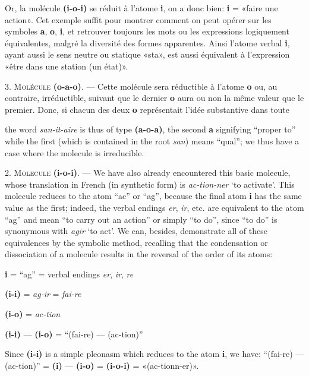 \begin{sloppypar}
{{     Or, la molécule \textbf{(i-o-i)} se réduit à l’atome \textbf{i},
     on a donc bien: \textbf{i} = «faire une action». Cet exemple
     suffit pour montrer comment on peut opérer sur les symboles
     \textbf{a}, \textbf{o}, \textbf{i}, et retrouver toujours les
     mots ou les expressions logiquement équivalentes, malgré la
     diversité des formes apparentes. Ainsi l’atome verbal \textbf{i},
     ayant aussi le sens neutre ou statique «sta», est aussi
     équivalent à l’expression «être dans une station (un état)».

     3. \textsc{Molécule} \textbf{(o-a-o)}. — Cette molécule sera
     réductible à l’atome \textbf{o} ou, au contraire, irréductible,
     suivant que le dernier \textbf{o} aura ou non la même valeur que
     le premier. Donc, si chacun des deux \textbf{o} représentait
     l’idée substantive dans toute}

 }
%
 {\noindent
   {\small
     the word \emph{san-it-aire} is thus of type \textbf{(a-o-a)}, the
     second \textbf{a} signifying ``proper to'' while the first (which
     is contained in the root \emph{san}) means ``qual''; we thus have a
     case where the molecule is irreducible.

     2. \textsc{Molecule} \textbf{(i-o-i)}. --- We have also already
     encountered this basic molecule, whose translation in French (in
     synthetic form) is \emph{ac-tion-ner} `to activate'. This
     molecule reduces to the atom ``ac'' or ``ag'', because the final
     atom \textbf{i} has the same value as the first; indeed, the
     verbal endings \emph{er}, \emph{ir}, etc. are equivalent to the
     atom ``ag'' and mean ``to carry out an action'' or simply ``to
     do'', since ``to do'' is synonymous with \emph{agir} `to act'. We
     can, besides, demonstrate all of these equivalences by the
     symbolic method, recalling that the condensation or dissociation
     of a molecule results in the reversal of the order of its atoms:

     \textbf{i} = ``ag'' = verbal endings \emph{er}, \emph{ir}, \emph{re}

     \textbf{(i-i)} = \emph{ag-ir} = \emph{fai-re}

     \textbf{(i-o)} = \emph{ac-tion}

     \textbf{(i-i)} --- \textbf{(i-o)} = ``(fai-re) --- (ac-tion)''

     Since \textbf{(i-i)} is a simple pleonasm which reduces to the
     atom \textbf{i}, we have: ``(fai-re) --- (ac-tion)'' =
     \textbf{(i)} — \textbf{(i-o)} = \textbf{(i-o-i)} =
     «(ac-tionn-er)».

}}
\end{sloppypar}
